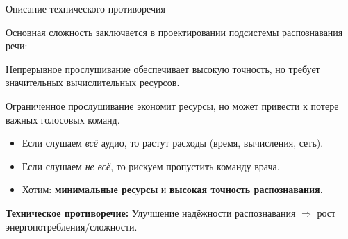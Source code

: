 \documentclass[aspectratio=169]{beamer}
\begin{document}
\begin{frame}{Описание технического противоречия}
  \item Основная сложность заключается в проектировании подсистемы распознавания речи:
  \begin{itemsize}
    \item Непрерывное прослушивание обеспечивает высокую точность, но требует значительных вычислительных ресурсов.
    \item Ограниченное прослушивание экономит ресурсы, но может привести к потере важных голосовых команд.
  \end{itemsize}
  \bigskip
  \begin{itemize}
    \item Если слушаем \emph{всё} аудио, то растут расходы (время, вычисления, сеть).
    \item Если слушаем \emph{не всё}, то рискуем пропустить команду врача.
    \item Хотим: \textbf{минимальные ресурсы} и \textbf{высокая точность распознавания}.
  \end{itemize}
  \bigskip
  \textbf{Техническое противоречие:} Улучшение надёжности распознавания \(\Rightarrow\) рост энергопотребления/сложности.
\end{frame}
\end{document}
